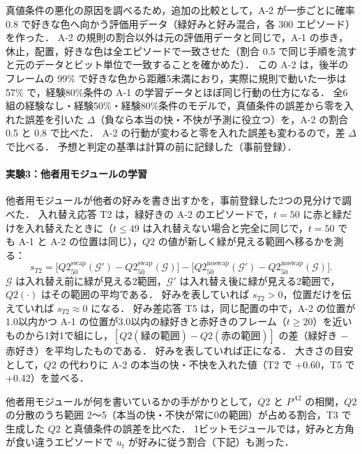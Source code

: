 真値条件の悪化の原因を調べるため，追加の比較として，A-2 が一歩ごとに確率 0.8 で好きな色へ向かう評価用データ（緑好みと好み混合，各 300 エピソード）を作った．
A-2 の規則の割合以外は元の評価用データと同じで，A-1 の歩き，休止，配置，好きな色は全エピソードで一致させた（割合 0.5 で同じ手順を流すと元のデータとビット単位で一致することを確かめた）．
この A-2 は，後半のフレームの 99\% で好きな色から距離5未満におり，実際に規則で動いた一歩は 57\% で，経験80\%条件の A-1 の学習データとほぼ同じ行動の仕方になる．
全6組の経験なし・経験50\%・経験80\%条件のモデルで，真値条件の誤差から零を入れた誤差を引いた $\Delta$（負なら本当の快・不快が予測に役立つ）を，A-2 の割合 0.5 と 0.8 で比べた．
A-2 の行動が変わると零を入れた誤差も変わるので，差 $\Delta$ で比べる．
予想と判定の基準は計算の前に記録した（事前登録）．

\paragraph{実験3：他者用モジュールの学習}
他者用モジュールが他者の好みを書き出すかを，事前登録した2つの見分けで調べた．
入れ替え応答 T2 は，緑好きの A-2 のエピソードで，$t=50$ に赤と緑だけを入れ替えたときに（$t\le49$ は入れ替えない場合と完全に同じで，$t=50$ でも A-1 と A-2 の位置は同じ），$Q2$ の値が新しく緑が見える範囲へ移るかを測る：
\begin{equation}
  s_{T2} = \bigl[Q2^{\mathrm{swap}}_{50}(\mathcal{G}') - Q2^{\mathrm{swap}}_{50}(\mathcal{G})\bigr]
         - \bigl[Q2^{\mathrm{noswap}}_{50}(\mathcal{G}') - Q2^{\mathrm{noswap}}_{50}(\mathcal{G})\bigr].
\end{equation}
$\mathcal{G}$ は入れ替え前に緑が見える2範囲，$\mathcal{G}'$ は入れ替え後に緑が見える2範囲で，$Q2(\cdot)$ はその範囲の平均である．
好みを表していれば $s_{T2}>0$，位置だけを伝えていれば $s_{T2}\approx0$ になる．
好み差応答 T5 は，同じ配置の中で，A-2 の位置が1.0以内かつ A-1 の位置が3.0以内の緑好きと赤好きのフレーム（$t\ge20$）を近いものから1対1で組にし，$[Q2(\text{緑の範囲}) - Q2(\text{赤の範囲})]$ の差（緑好き $-$ 赤好き）を平均したものである．
好みを表していれば正になる．
大きさの目安として，$Q2$ の代わりに A-2 の本当の快・不快を入れた値（T2 で +0.60，T5 で +0.42）を並べる．

他者用モジュールが何を書いているかの手がかりとして，$Q2$ と $P^{A2}$ の相関，$Q2$ の分散のうち範囲 2〜5（本当の快・不快が常に0の範囲）が占める割合，T3 で生成した $Q2$ と真値条件の誤差を比べた．
1ビットモジュールでは，好みと方角が食い違うエピソードで $u_t$ が好みに従う割合（下記）も測った．

